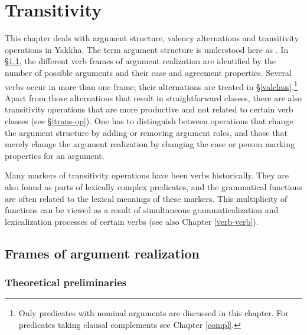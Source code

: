 ﻿%

\chapter{Transitivity}\label{verb-val}

This chapter deals with argument structure, valency alternations and transitivity operations in Yakkha. The term argument structure is understood here as  \citep[1130]{Haspelmath2004_Valency}. In §\ref{frames}, the  different verb frames of argument realization are identified by the number of possible arguments and their case and agreement properties. Several verbs occur in more than one frame; their alternations are treated in §\ref{valclass}.\footnote{Only predicates with nominal arguments are discussed in this chapter. For predicates taking clausal complements see Chapter \ref{compl}.} Apart from those alternations that result in straightforward classes, there are also transitivity operations that are more productive and not related to certain verb classes (see §\ref{trans-op}). One has to distinguish between operations that change the argument structure by adding or removing argument roles, and those that merely change the argument realization by changing the case or person marking properties for an argument. 

Many markers of transitivity operations have been verbs historically. They are also found as parts of lexically complex predicates, and the grammatical functions are often related to the lexical meanings of these markers. This multiplicity of functions can be viewed as a result of simultaneous grammaticalization and lexicalization processes of certain verbs (see also Chapter \ref{verb-verb}). 

\section{Frames of argument realization}\label{frames}

\subsection{Theoretical preliminaries}

